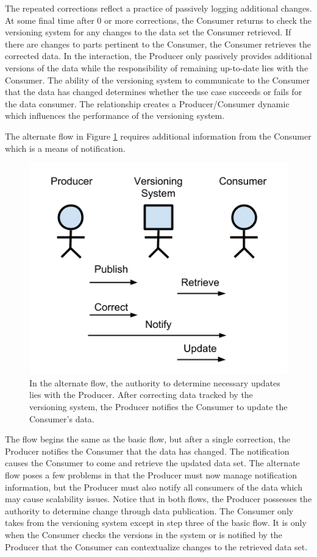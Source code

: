 The repeated corrections reflect a practice of passively logging additional changes.
At some final time after 0 or more corrections, the Consumer returns to check the versioning system for any changes to the data set the Consumer retrieved.
If there are changes to parts pertinent to the Consumer, the Consumer retrieves the corrected data.
In the interaction, the Producer only passively provides additional versions of the data while the responsibility of remaining up-to-date lies with the Consumer.
The ability of the  versioning system to communicate to the Consumer that the data has changed determines whether the use case succeeds or fails for the data consumer.
The relationship creates a Producer/Consumer dynamic which influences the performance of the versioning system.

The alternate flow in Figure \ref{UCD2} requires additional information from the Consumer which is a means of notification.
\begin{figure}
	\centering
	\includegraphics[scale=1]{figures/UC_Diagram2.png}
	\caption[Versioning Use Case Alternate Flow]{In the alternate flow, the authority to determine necessary updates lies with the Producer.  After correcting data tracked by the versioning system, the Producer notifies the Consumer to update the Consumer's data.}
	\label{UCD2}
\end{figure}
The flow begins the same as the basic flow, but after a single correction, the Producer notifies the Consumer that the data has changed.
The notification causes the Consumer to come and retrieve the updated data set.
The alternate flow poses a few problems in that the Producer must now manage notification information, but the Producer must also notify all consumers of the data which may cause scalability issues.
Notice that in both flows, the Producer possesses the authority to determine change through data publication.
The Consumer only takes from the versioning system except in step three of the basic flow.
It is only when the Consumer checks the \glspl{version} in the system or is notified by the Producer that the Consumer can contextualize changes to the retrieved data set.


